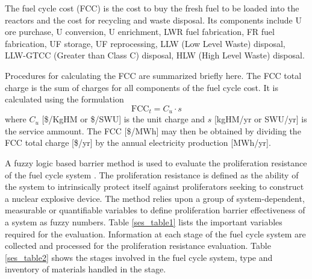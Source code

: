 The fuel cycle cost (FCC) is the cost to buy the fresh fuel to be loaded into
the reactors and the cost for recycling and waste disposal.  Its
components include U ore purchase, U conversion, U enrichment, LWR fuel
fabrication, FR fuel fabrication, UF storage, UF reprocessing, LLW
(Low Level Waste) disposal, LLW-GTCC (Greater than Class C) disposal,
HLW (High Level Waste) disposal. 

Procedures for calculating the FCC are 
summarized briefly here.  The FCC
total charge is the sum of charges for all components of the fuel cycle
cost.  It is calculated using the formulation
\begin{equation}
\label{ses_FCC}
\mbox{FCC}_t = C_u \cdot s
\end{equation}
where $C_u$ [\$/KgHM or \$/SWU] is the unit charge and $s$ [kgHM/yr or SWU/yr] 
is the service ammount. The FCC [\$/MWh] may then be obtained by dividing the 
FCC total charge [\$/yr] by the annual electricity production [MWh/yr].

A fuzzy logic based barrier method is used to evaluate the
proliferation resistance of the fuel cycle system \cite{Li2009}. The proliferation
resistance is defined as the ability of the system to intrinsically
protect itself against proliferators seeking to construct a nuclear
explosive device. The method relies upon a group of system-dependent,
measurable or quantifiable variables to define proliferation barrier
effectiveness of a system as fuzzy numbers. 
Table \ref{ses_table1} lists the important variables required for
the evaluation. Information at each stage of the fuel cycle system are
collected and processed for the proliferation resistance evaluation.
Table \ref{ses_table2} shows the stages involved in the fuel cycle system, type and
inventory of materials handled in the stage.


